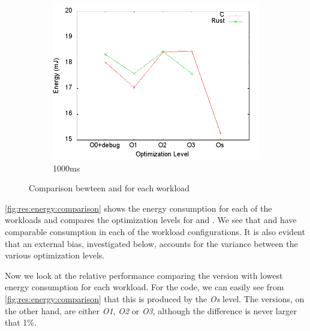 \begin{figure}[H]
  \begin{subfigure}{0.49\textwidth}
    \includegraphics[width=\textwidth]{results/plots/energy/1000.png}
    \caption{1000ms}
  \end{subfigure}

  \caption{Comparison bewteen {\rust} and {\C} for each workload}
  \label{fig:res:energy:comparison}
\end{figure}

\autoref{fig:res:energy:comparison} shows the energy consumption for each of the workloads and compares the optimization levels for {\rust} and {\C}.
We see that {\rust} and {\C} have comparable consumption in each of the workload configurations.
It is also evident that an external bias, investigated below, accounts for the variance between the various optimization levels.

Now we look at the relative performance comparing the version with lowest energy consumption for each workload.
For the {\C} code, we can easily see from \autoref{fig:res:energy:comparison} that this is produced by the \emph{Os} level.
The {\rust} versions, on the other hand, are either \emph{O1}, \emph{O2} or \emph{O3}, although the difference is never larger that 1\%.

